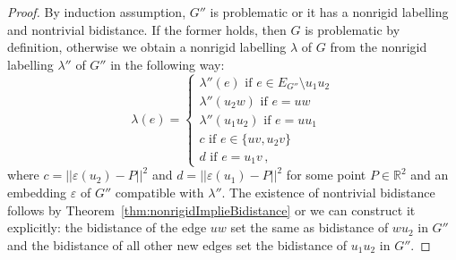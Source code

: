 \documentclass[a4paper, 11pt]{article}
\newcommand{\RR}{\mathbb{R}}
\theoremstyle{definition}
\begin{document}
\begin{proof}
By induction assumption, $G''$ is problematic or it has a nonrigid labelling and nontrivial bidistance. If the former holds, then $G$ is problematic by definition, otherwise we obtain a nonrigid labelling $\lambda$ of $G$ from the nonrigid labelling $\lambda''$ of $G''$ in the following way:
$$
\lambda(e)=\begin{cases}
\lambda''(e) \text{ if } e\in E_{G''}\setminus u_1u_2\\
\lambda''(u_2w) \text{ if } e=uw\\
\lambda''(u_1u_2) \text{ if } e=uu_1\\
c \text{ if } e\in\{uv,u_2v\}\\
d \text{ if } e=u_1v\,,
\end{cases}
$$
where $c=||\varepsilon(u_2)-P||^2$ and $d=||\varepsilon(u_1)-P||^2$ for some point $P\in\RR^2$ and an embedding $\varepsilon$ of $G''$ compatible with $\lambda''$. The existence of nontrivial bidistance follows by Theorem~\ref{thm:nonrigidImplieBidistance} or we can construct it explicitly: the bidistance of the edge $uw$ set the same as bidistance of $wu_2$ in $G''$ and the bidistance of all other new edges set the bidistance of $u_1u_2$ in $G''$.
\end{proof}
\end{document}
